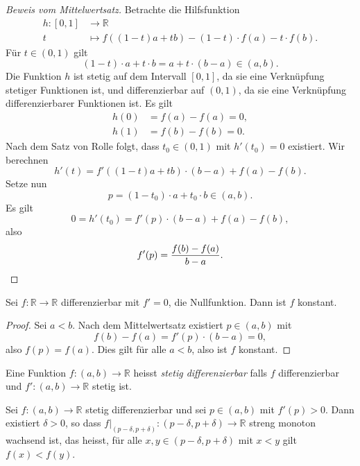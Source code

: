 \documentclass[../main.tex]{subfiles}
\begin{document}
\begin{proof}[Beweis vom Mittelwertsatz]
  Betrachte die Hilfsfunktion 
  \begin{align*}
    h \colon [0, 1] & \to \mathbb{R} \\
    t & \mapsto f((1- t)a + tb) - (1-t) \cdot f(a) - t\cdot f(b).
  \end{align*}
  Für $t \in (0, 1)$ gilt
  \[
    (1- t) \cdot a + t \cdot b = a + t \cdot (b-a) \in (a, b).
  \]
  Die Funktion $h$ ist stetig auf dem Intervall $[0, 1]$,
  da sie eine Verknüpfung stetiger Funktionen ist,
  und differenzierbar auf $(0, 1)$, da sie eine Verknüpfung
  differenzierbarer Funktionen ist.
  Es gilt
  \begin{align*}
    h(0) &= f(a) - f(a) = 0,\\
    h(1) & = f(b) - f(b) = 0.
  \end{align*}
  Nach dem Satz von Rolle folgt, dass
  $t_0 \in (0, 1)$ mit $h'(t_0) = 0$ 
  existiert.
  Wir berechnen \[
    h'(t)  = f'((1-t)a + tb) \cdot (b-a) 
  + f(a) - f(b). \]
  Setze nun
  \[
    p = (1- t_0) \cdot a + t_0 \cdot b \in (a, b).
  \]
  Es gilt
  \[
    0 = h'(t_0) = f'(p) \cdot (b-a) + f(a) - f(b),
  \]
  also
  \[
    f'(p) = \frac{f(b) - f(a)}{b-a}. \qedhere
  \]
\end{proof}

\begin{corollary}
  Sei $f \colon \mathbb{R} \to \mathbb{R}$ differenzierbar
  mit $f' = 0$, die Nullfunktion.
  Dann ist $f$ konstant.
\end{corollary}

\begin{proof}
  Sei $a < b$. Nach dem Mittelwertsatz
  existiert $p \in (a, b)$ mit
  \[
    f(b) - f(a) = f'(p) \cdot (b-a) = 0,
  \]
  also $f(p) = f(a)$.
  Dies gilt für alle $a < b$, also
  ist $f$ konstant.
\end{proof}

\begin{definition}
  Eine Funktion $f \colon (a, b) \to \mathbb{R}$ 
  heisst \emph{stetig differenzierbar} falls
  $f$ differenzierbar und $f' \colon (a, b) \to \mathbb{R}$ 
  stetig ist.
\end{definition}


\begin{corollary}\label{cor:strictly-monotone}
  Sei $f \colon (a, b) \to \mathbb{R}$ 
  stetig differenzierbar und sei
  $p \in (a, b)$ mit $f'(p) > 0$.
  Dann existiert $\delta > 0$,
  so dass $f|_{(p- \delta, p + \delta)}
  \colon (p - \delta, p + \delta) \to \mathbb{R}$ 
  streng monoton wachsend ist,
  das heisst, für alle $x, y \in (p - \delta, p + \delta)$ 
  mit $x < y$ gilt
  $f(x) < f(y)$.
\end{corollary}
\end{document}
